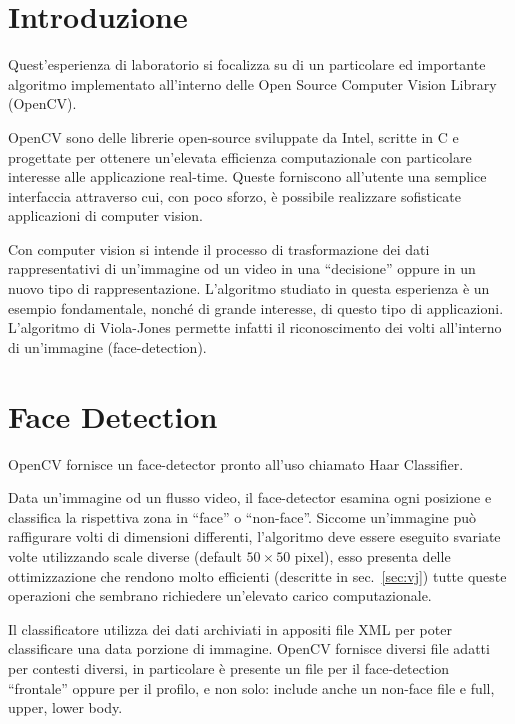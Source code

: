\documentclass[a4paper,11pt]{article}
\newcommand{\cv}{OpenCV}
\begin{document}

\tableofcontents

\section{Introduzione}
\label{sec:intro}
Quest'esperienza di laboratorio si focalizza su di un particolare ed
importante algoritmo implementato all'interno delle Open Source
Computer Vision Library (\cv{}).

\cv{} sono delle librerie open-source sviluppate da Intel, scritte in
C e progettate per ottenere un'elevata efficienza computazionale con
particolare interesse alle applicazione real-time. Queste forniscono
all'utente una semplice interfaccia attraverso cui, con poco sforzo, è
possibile realizzare sofisticate applicazioni di computer vision.

Con computer vision si intende il processo di trasformazione dei dati
rappresentativi di un'immagine od un video in una ``decisione'' oppure
in un nuovo tipo di rappresentazione. L'algoritmo studiato in questa
esperienza è un esempio fondamentale, nonché di grande interesse, di
questo tipo di applicazioni. L'algoritmo di Viola-Jones permette
infatti il riconoscimento dei volti all'interno di un'immagine
(face-detection).

\section{Face Detection}
\label{sec:face}
\cv{} fornisce un face-detector pronto all'uso chiamato Haar
Classifier. 

Data un'immagine od un flusso video, il face-detector esamina ogni
posizione e classifica la rispettiva zona in ``face'' o
``non-face''. Siccome un'immagine può raffigurare volti di dimensioni
differenti, l'algoritmo deve essere eseguito svariate volte
utilizzando scale diverse (default $50\times 50$ pixel), esso presenta
delle ottimizzazione che rendono molto efficienti (descritte in
sec.~\ref{sec:vj}) tutte queste operazioni che sembrano richiedere
un'elevato carico computazionale.

Il classificatore utilizza dei dati archiviati in appositi file XML
per poter classificare una data porzione di immagine. \cv{} fornisce
diversi file adatti per contesti diversi, in particolare è presente un
file per il face-detection ``frontale'' oppure per il profilo, e non
solo: include anche un non-face file e full, upper, lower body.
\end{document}
